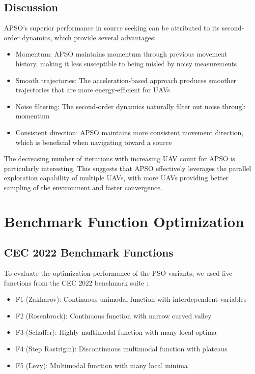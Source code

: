 \documentclass[conference]{IEEEtran}
\begin{document}
\subsection{Discussion}
APSO's superior performance in source seeking can be attributed to its second-order dynamics, which provide several advantages:

\begin{itemize}
    \item Momentum: APSO maintains momentum through previous movement history, making it less susceptible to being misled by noisy measurements
    \item Smooth trajectories: The acceleration-based approach produces smoother trajectories that are more energy-efficient for UAVs
    \item Noise filtering: The second-order dynamics naturally filter out noise through momentum
    \item Consistent direction: APSO maintains more consistent movement direction, which is beneficial when navigating toward a source
\end{itemize}

The decreasing number of iterations with increasing UAV count for APSO is particularly interesting. This suggests that APSO effectively leverages the parallel exploration capability of multiple UAVs, with more UAVs providing better sampling of the environment and faster convergence.

\section{Benchmark Function Optimization}
\subsection{CEC 2022 Benchmark Functions}
To evaluate the optimization performance of the PSO variants, we used five functions from the CEC 2022 benchmark suite \cite{luo2022benchmarkfunctionscec2022}:

\begin{itemize}
    \item F1 (Zakharov): Continuous unimodal function with interdependent variables
    \item F2 (Rosenbrock): Continuous function with narrow curved valley
    \item F3 (Schaffer): Highly multimodal function with many local optima
    \item F4 (Step Rastrigin): Discontinuous multimodal function with plateaus
    \item F5 (Levy): Multimodal function with many local minima
\end{itemize}
\end{document}

